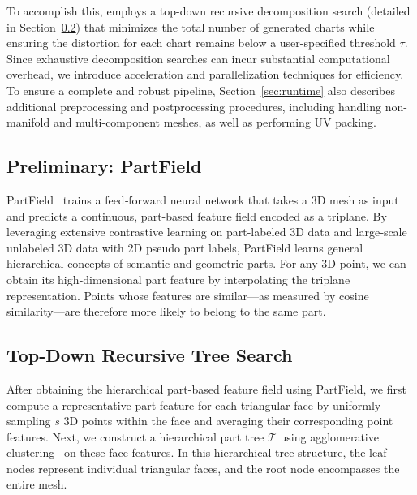 To accomplish this, \ourmodel employs a top-down recursive decomposition search (detailed in Section~\ref{sec:search}) that minimizes the total number of generated charts while ensuring the distortion for each chart remains below a user-specified threshold $\tau$. Since exhaustive decomposition searches can incur substantial computational overhead, we introduce acceleration and parallelization techniques for efficiency. To ensure a complete and robust pipeline, Section~\ref{sec:runtime} also describes additional preprocessing and postprocessing procedures, including handling non-manifold and multi-component meshes, as well as performing UV packing.

\subsection{Preliminary: PartField}
\label{sec:partfield}

PartField~\cite{liu2025partfield} trains a feed‑forward neural network that takes a 3D mesh as input and predicts a continuous, part-based feature field encoded as a triplane. By leveraging extensive contrastive learning on part-labeled 3D data and large‑scale unlabeled 3D data with 2D pseudo part labels, PartField learns general hierarchical concepts of semantic and geometric parts. For any 3D point, we can obtain its high‑dimensional part feature by interpolating the triplane representation. Points whose features are similar—as measured by cosine similarity—are therefore more likely to belong to the same part.
\subsection{Top-Down Recursive Tree Search}
\label{sec:search}

After obtaining the hierarchical part-based feature field using PartField, we first compute a representative part feature for each triangular face by uniformly sampling $s$ 3D points within the face and averaging their corresponding point features. Next, we construct a hierarchical part tree $\mathcal{T}$ using agglomerative clustering~\cite{johnson1967hierarchical} on these face features. In this hierarchical tree structure, the leaf nodes represent individual triangular faces, and the root node encompasses the entire mesh.



